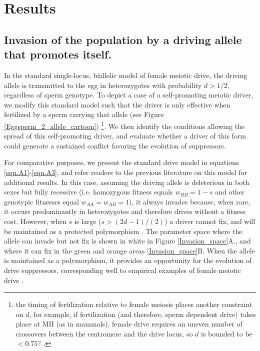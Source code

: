\documentclass[12pt,letterpaper]{article}
\begin{document}
\section*{Results}

\subsection*{ Invasion of the population by a driving allele that promotes
itself.}

In the standard single-locus, biallelic model of female meiotic drive,
the driving allele is transmitted to the egg  in heterozygotes with
probability  $d > 1/2$, regardless of sperm genotype. To depict a case
of a self-promoting meiotic driver,  we modify this standard model such that the driver is only effective when fertilized by a sperm carrying that allele (see Figure
\ref{Eggsperm_2_allele_cartoon})
\footnote{the timing of fertilization relative to female meiosis places another constraint on $d$, for example, if fertilization (and therefore, sperm dependent drive) takes place at MII (as in mammals),
	female drive requires an uneven number of crossovers between the centromere and the drive locus, 
	so $d$ is bounded to be $<0.75$? \citep[see ][ for
        discussion]{Buckler1999}. }. %
We then identify the conditions allowing the spread of this self-promoting driver, 
	and evaluate whether a driver of this form could generate a sustained conflict favoring the evolution of suppressors. 

For comparative purposes, we present the standard drive model in equations \ref{eqn.A1}-\ref{eqn.A3}, 
	and refer readers to the previous literature on this model \citep[e.g. ][]{Prout1973,Ubeda2004} for additional results. 
In this case, assuming the driving allele is deleterious in both sexes but fully recessive 
	(i.e. homozygous fitness equals $w_{BB}=1-s$ and other genotypic fitnesses equal $w_{AA}=w_{AB}=1$), 
	it always invades because,  when rare, it occurs predominantly in heterozygotes and therefore drives without a fitness cost. 
However, when $s$ is large ($s>(2d-1)/(2)$) a driver cannot fix, and
will be maintained as a protected polymorphism \citep{Prout1973}. The
        parameter space where the allele can invade but not fix is shown in white
        in Figure \ref{Invasion_space}A., and where it can fix in the green
        and orange areas \ref{Invasion_space}B. When the allele is
        maintained as a polymorphism, it provides an opportunity for the evolution of
	drive suppressors, corresponding well to empirical examples of
        female meiotic drive \citep[reviewed in ][]{Burt2006}. 
\end{document}
